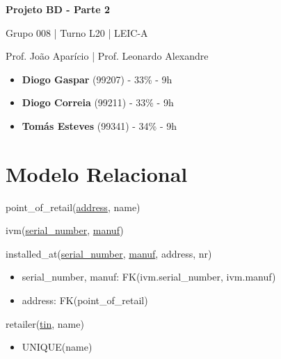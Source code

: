 \documentclass[12pt,a4paper]{article}
\begin{document}
  \begin{titlepage}
    \begin{center}
      \vspace*{5cm}

      \Huge
      \textbf{Projeto BD - Parte 2}

      \vspace{0.5cm}
      \LARGE
      Grupo 008 | Turno L20 | LEIC-A

      \vspace{0.5cm}
      \large
      Prof. João Aparício | Prof. Leonardo Alexandre

      \vfill
    \end{center}
    \large
    \begin{itemize}
      \item[] \textbf{Diogo Gaspar} (99207) - 33\% - 9h
      \item[] \textbf{Diogo Correia} (99211) - 33\% - 9h
      \item[] \textbf{Tomás Esteves} (99341) - 34\% - 9h
    \end{itemize}
  \end{titlepage}

  \section*{Modelo Relacional}

  \ttfamily

  \noindent
  point\_of\_retail(\underline{address}, name)
  
  \vspace*{10pt}

  \noindent
  ivm(\underline{serial\_number}, \underline{manuf})

  \vspace*{10pt}

  \noindent
  installed\_at(\underline{serial\_number}, \underline{manuf}, address, nr)
  \begin{itemize}[nosep]
    \item serial\_number, manuf: FK(ivm.serial\_number, ivm.manuf)
    \item address: FK(point\_of\_retail)
  \end{itemize}

  \vspace*{10pt}

  \noindent
  retailer(\underline{tin}, name)
  \begin{itemize}[nosep]
    \item UNIQUE(name)
  \end{itemize}
\end{document}
